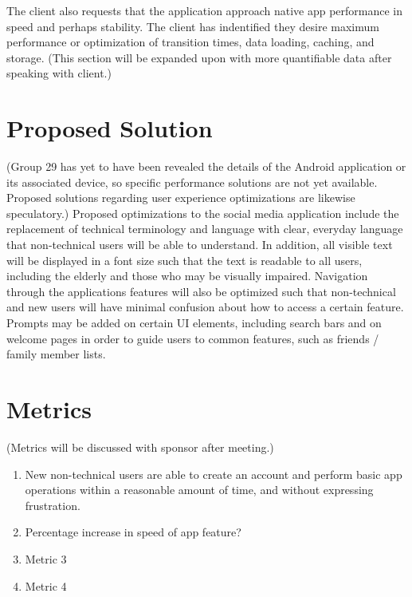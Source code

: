 \documentclass[letterpaper,10pt,fleqn,draftclsnofoot,onecolumn]{article}
\begin{document}
The client also requests that the application approach native app performance in speed and perhaps stability. The client has indentified they desire maximum performance or optimization of transition times, data loading, caching, and storage. (This section will be expanded upon with more quantifiable data after speaking with client.)

\section*{Proposed Solution}

(Group 29 has yet to have been revealed the details of the Android application or its associated device, so specific performance solutions are not yet available. Proposed solutions regarding user experience optimizations are likewise speculatory.)
Proposed optimizations to the social media application include the replacement of technical terminology and language with clear, everyday language that non-technical users will be able to understand. In addition, all visible text will be displayed in a font size such that the text is readable to all users, including the elderly and those who may be visually impaired. Navigation through the applications features will also be optimized such that non-technical and new users will have minimal confusion about how to access a certain feature. Prompts may be added on certain UI elements, including search bars and on welcome pages in order to guide users to common features, such as friends / family member lists. 

\section*{Metrics}

(Metrics will be discussed with sponsor after meeting.)

\begin{enumerate}
\item New non-technical users are able to create an account and perform basic app operations within a reasonable amount of time, and without expressing frustration.
\item Percentage increase in speed of app feature?
\item Metric 3
\item Metric 4
\end{enumerate}
\end{document}
